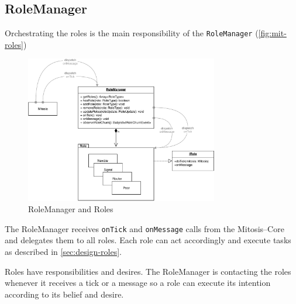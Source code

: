\subsection{RoleManager}\label{sec:mit-roleManager}
Orchestrating the roles is the main responsibility of the \lstinline|RoleManager| (\vref{fig:mit-roles})

\begin{figure}
\centering
\includegraphics[width=0.75\textwidth]{graphics/implementation/mitosis-architecture-roles.pdf}
\caption{RoleManager and Roles}
\label{fig:mit-roles}
\end{figure}

The RoleManager receives \lstinline|onTick| and \lstinline|onMessage| calls from the Mitosis–Core and delegates them to all roles. Each role can act accordingly and execute tasks as described in \vref{sec:design-roles}.

Roles have responsibilities and desires. The RoleManager is contacting the roles whenever it receives a tick or a message so a role can execute its intention according to its belief and desire.

